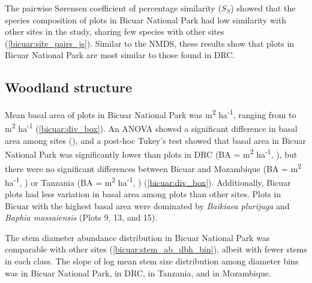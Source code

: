 \begin{refsection}
The pairwise S\o{}rensen coefficient of percentage similarity ($S_{S}$) showed that the species composition of plots in Bicuar National Park had low similarity with other sites in the study, sharing few species with other sites (\autoref{bicuar:site_pairs_js}). Similar to the NMDS, these results show that plots in Bicuar National Park are most similar to those found in DRC. 



\subsection{Woodland structure}
\label{bicuar:ssec:struc}

Mean basal area of plots in Bicuar National Park was \babicuar{} m\textsuperscript{2} ha\textsuperscript{-1}, ranging from \bicuarbamin{} to \bicuarbamax{} m\textsuperscript{2} ha\textsuperscript{-1} (\autoref{bicuar:div_box}). An ANOVA showed a significant difference in basal area among sites (\lmba{}), and a post-hoc Tukey's test showed that basal area in Bicuar National Park was significantly lower than plots in DRC (BA = \badrc{} m\textsuperscript{2} ha\textsuperscript{-1}, \tukeybabicuardrc{}), but there were no significant differences between Bicuar and Mozambique (BA = \banham{} m\textsuperscript{2} ha\textsuperscript{-1}, \tukeybabicuarnham{}) or Tanzania (BA = \bakilwa{} m\textsuperscript{2} ha\textsuperscript{-1}, \tukeybabicuarkilwa{}) (\autoref{bicuar:div_box}). Additionally, Bicuar plots had less variation in basal area among plots than other sites. Plots in Bicuar with the highest basal area were dominated by \textit{Baikiaea plurijuga} and \textit{Baphia massaiensis} (Plots 9, 13, and 15). 

The stem diameter abundance distribution in Bicuar National Park was comparable with other sites (\autoref{bicuar:stem_ab_dbh_bin}), albeit with fewer stems in each class. The slope of log mean stem size distribution among diameter bins was \dbhslopebicuar{} in Bicuar National Park, \dbhslopedrc{} in DRC, \dbhslopekilwa{} in Tanzania, and \dbhslopenham{} in Mozambique.  


\end{refsection}
